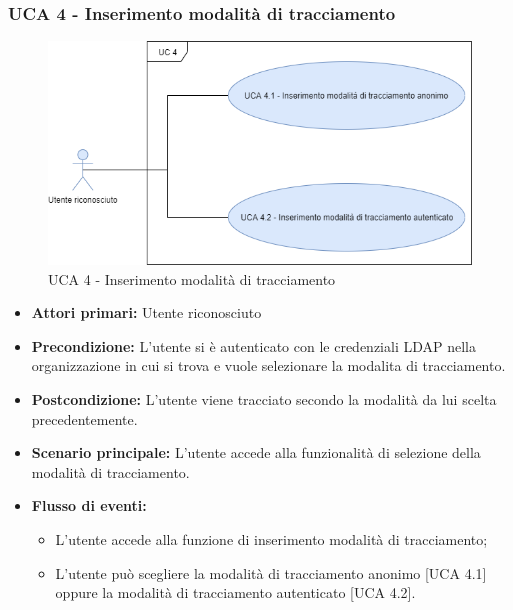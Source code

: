 \newpage
\subsubsection{UCA 4 - Inserimento modalità di tracciamento}%

\begin{figure}[h]
	\centering	
	\includegraphics[scale=0.53]{sezioni/UseCase/Immagini/UCA4.png}
	\caption{UCA 4 - Inserimento modalità di tracciamento}
\end{figure}

\begin{itemize}
	\item \textbf{Attori primari:} Utente riconosciuto
	\item \textbf{Precondizione:} L'utente si è autenticato con le credenziali LDAP nella organizzazione in cui si trova e vuole selezionare la modalita di tracciamento.
	\item \textbf{Postcondizione:} L'utente viene tracciato secondo la modalità da lui scelta precedentemente.
	\item \textbf{Scenario principale:} L'utente accede alla funzionalità di selezione della modalità di tracciamento.
	\item \textbf{Flusso di eventi:}
	\begin{itemize}
		\item L'utente accede alla funzione di inserimento modalità di tracciamento;
		\item L'utente può scegliere la modalità di tracciamento anonimo [UCA 4.1] oppure la modalità di tracciamento autenticato [UCA 4.2].
	\end{itemize}
\end{itemize}

